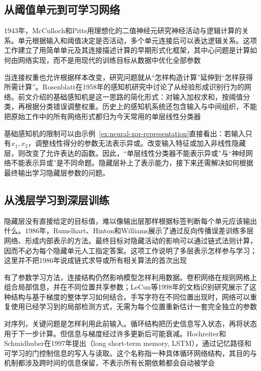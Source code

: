 \subsection{从阈值单元到可学习网络}
\label{sec:neural-history-threshold}

1943年，McCulloch和Pitts用理想化的二值神经元研究神经活动与逻辑计算的关系。单元根据输入和阈值决定是否活动，多个单元连接后可以表达逻辑关系。这项工作建立了用简单单元及其连接描述计算的早期形式化框架，其中心问题是计算如何由网络实现，而不是用现代的训练目标从数据中优化全部参数

当连接权重也允许根据样本改变，研究问题就从“怎样构造计算”延伸到“怎样获得所需计算”。Rosenblatt在1958年的感知机研究中讨论了从经验形成识别行为的网络。前文介绍的基础感知机是这一思路的简化形式：对输入加权求和，按阈值分类，再根据分类错误调整权重。历史上的感知机系统还包含输入与中间组织，不能把原始工作中的所有网络形式都归为今天常用的单层线性分类器

基础感知机的限制可以由示例~\ref{ex:neural-xor-representation}直接看出：若输入只有$x_1,x_2$，调整线性得分的参数无法表示异或。改变输入特征或加入非线性隐藏层，则改变了允许表达的函数。因此，“单层线性分类器不能表示异或”与“神经网络不能表示异或”是不同命题。隐藏层补上了表示能力，接下来还需解决如何根据最终输出学习隐藏层参数的问题。

\subsection{从浅层学习到深层训练}
\label{sec:neural-history-deep-training}

隐藏层没有直接给定的目标值，难以像输出层那样根据标签判断每个单元应该输出什么。1986年，Rumelhart、Hinton和Williams展示了通过反向传播误差训练多层网络、形成内部表示的方法。最终目标对隐藏活动的影响可以通过链式法则计算，因而不必为每个隐藏单元人工指定答案。这项工作说明了多层表示怎样参与学习；这里并不把1986年说成链式求导或所有相关算法的首次出现

有了参数学习方法，连接结构仍然影响模型怎样利用数据。卷积网络在规则网格上组合局部信息，并在不同位置共享参数；LeCun等1998年的文档识别研究展示了这种结构与基于梯度的整体学习如何结合。手写字符在不同位置出现时，网络可以重复使用已经学习到的局部检测方式，无需为每个位置重新估计一套完全独立的参数

对序列，关键问题是怎样利用此前输入。循环结构把历史信息写入状态，再将状态用于下一步计算。但信息与梯度经过许多更新后可能衰减。Hochreiter和Schmidhuber在1997年提出（long short-term memory, LSTM），通过记忆路径和可学习的门控制信息的写入与读取。这个名称指一种具体循环网络结构，其目的与机制都涉及跨时间的信息保留，不表示所有长期依赖都会自动被学会

